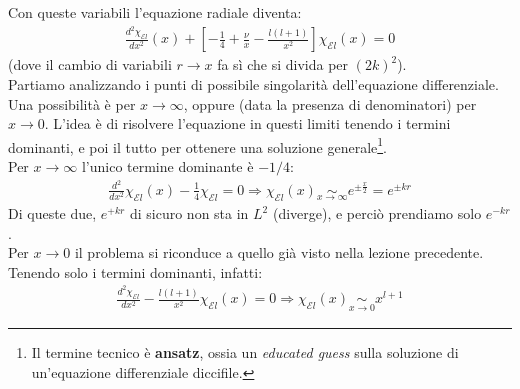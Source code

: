 \documentclass[../../FisicaTeorica.tex]{subfiles}
\begin{document}
Con queste variabili l'equazione radiale diventa:
\begin{align*}
\frac{d^2 \chi_{\mathcal{E}l}}{dx^2}(x) + \left[
-\frac{1}{4} + \frac{\nu}{x}-\frac{l(l+1)}{x^2} 
\right] \chi_{\mathcal{E}l}(x) = 0
\end{align*}
(dove il cambio di variabili $r \to x$ fa sì che si divida per $(2k)^2$).\\
Partiamo analizzando i punti di possibile singolarità dell'equazione differenziale. Una possibilità è per $x\to \infty$, oppure (data la presenza di denominatori) per $x\to 0$. L'idea è di risolvere l'equazione in questi limiti tenendo i termini dominanti, e poi  il tutto per ottenere una soluzione generale\footnote{Il termine tecnico è \textbf{ansatz}, ossia un \textit{educated guess} sulla soluzione di un'equazione differenziale diccifile.}.\\
Per $x\to \infty$ l'unico termine dominante è $-1/4$:
\begin{align*}
\frac{d^2}{dx^2}\chi_{\mathcal{E}l}(x) - \frac{1}{4}\chi_{\mathcal{E}l} = 0 \Rightarrow  \chi_{\mathcal{E}l}(x) \underset{x \to \infty}{\sim} e^{\pm\frac{x}{2}} = e^{\pm kr}
\end{align*}
Di queste due, $e^{+kr}$ di sicuro non sta in $L^2$ (diverge), e perciò prendiamo solo $e^{-kr}$.\\

Per $x\to 0$ il problema si riconduce a quello già visto nella lezione precedente. Tenendo solo i termini dominanti, infatti:
\begin{align*}
\frac{d^2 \chi_{\mathcal{E}l}}{dx^2} - \frac{l(l+1)}{x^2}\chi_{\mathcal{E}l} (x) = 0 \Rightarrow  \chi_{\mathcal{E}l}(x) \underset{x\to 0}{\sim} x^{l+1}
\end{align*}
\end{document}
